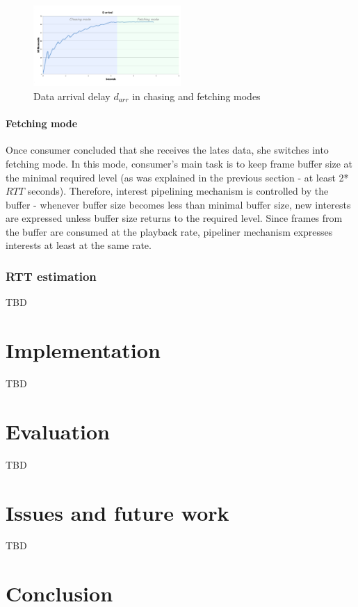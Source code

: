 \documentclass[10pt]{proc}
\begin{document}
\begin{figure}[Ht!]
\centering
\includegraphics[width=0.5\textwidth]{darr}
\caption{Data arrival delay $d_{arr}$ in chasing and fetching modes}
\label{fig:darr}
\end{figure} 

\paragraph{Fetching mode}

Once consumer concluded that she receives the lates data, she switches into fetching mode. In this mode, consumer's main task is to keep frame buffer size at the minimal required level (as was explained in the previous section - at least 2*$RTT$ seconds). Therefore, interest pipelining mechanism is controlled by the buffer - whenever buffer size becomes less than minimal buffer size, new interests are expressed unless buffer size returns to the required level. Since frames from the buffer are consumed at the playback rate, pipeliner mechanism expresses interests at least at the same rate.

\subsubsection{RTT estimation}
TBD

\section{Implementation}
TBD

\section{Evaluation}
TBD

\section{Issues and future work}
TBD

\section{Conclusion}
\end{document}
